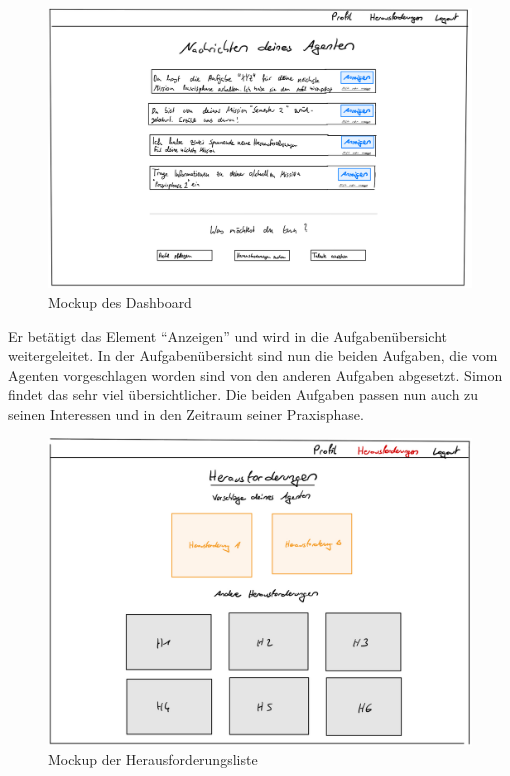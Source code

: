 \documentclass[
  12pt,
  ngerman,
  a4paper,
]{article}
\begin{document}
\begin{figure}
\centering
\includegraphics{./tex2pdf.-930e6666e1221838/3da0b6a22e1420a1cf0259b225757671a18ac72e.jpg}
\caption{Mockup des Dashboard}
\end{figure}

Er betätigt das Element ``Anzeigen'' und wird in die Aufgabenübersicht
weitergeleitet. In der Aufgabenübersicht sind nun die beiden Aufgaben,
die vom Agenten vorgeschlagen worden sind von den anderen Aufgaben
abgesetzt. Simon findet das sehr viel übersichtlicher. Die beiden
Aufgaben passen nun auch zu seinen Interessen und in den Zeitraum seiner
Praxisphase.

\begin{figure}
\centering
\includegraphics{./tex2pdf.-930e6666e1221838/11eec356048ca740a12f41d180c91463df52f779.jpg}
\caption{Mockup der Herausforderungsliste}
\end{figure}
\end{document}

